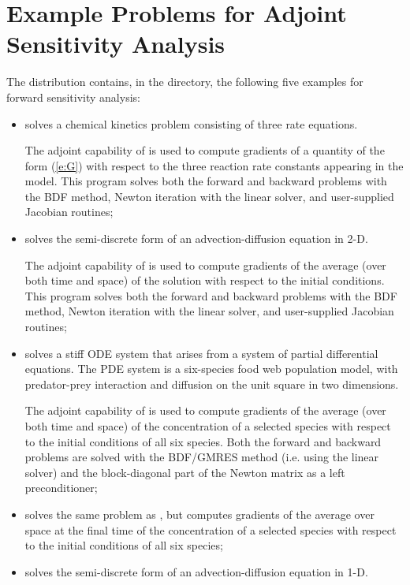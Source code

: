 \section{Example Problems for Adjoint Sensitivity Analysis}\label{s:adj_examples}

The {\cvodes} distribution contains, in the 
directory, the following five examples for forward sensitivity analysis:

\begin{itemize}
\item {}
  solves a chemical kinetics problem consisting of three rate equations.
  
  The adjoint capability of {\cvodes} is used to compute gradients
  of a quantity of the form (\ref{e:G}) with respect to the three
  reaction rate constants appearing in the model.
  This program solves both the forward and backward problems with the BDF method, 
  Newton iteration with the {\cvdense} linear solver, and user-supplied    
  Jacobian routines;
\item {}
  solves the semi-discrete form of an advection-diffusion equation in 2-D.

  The adjoint capability of {\cvodes} is used to compute gradients
  of the average (over both time and space) of the solution with respect to
  the initial conditions.
  This program solves both the forward and backward problems with the BDF method, 
  Newton iteration with the {\cvband} linear solver, and user-supplied     
  Jacobian routines;
\item {}
  solves a stiff ODE system that arises from a system     
  of partial differential equations.  The PDE system is a six-species
  food web population model, with predator-prey interaction and diffusion 
  on the unit square in two dimensions.

  The adjoint capability of {\cvodes} is used to compute gradients
  of the average (over both time and space) of the concentration of a selected species
  with respect to the initial conditions of all six species.
  Both the forward and backward problems are solved with the BDF/GMRES method 
  (i.e. using the {\cvspgmr} linear solver) and the block-diagonal part of the  
  Newton matrix as a left preconditioner;
\item {}
  solves the same problem as , but computes gradients
  of the average over space at the final time of the concentration of a selected species
  with respect to the initial conditions of all six species;
\item {}
  solves the semi-discrete form of an advection-diffusion equation in 1-D.


\end{itemize}
